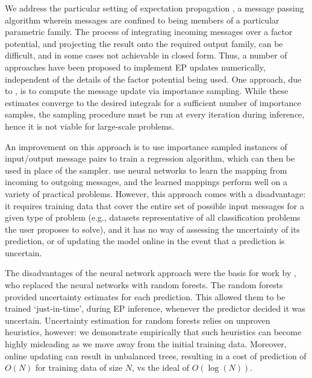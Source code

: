 \documentclass[english]{article}
\theoremstyle{plain}
\theoremstyle{plain}
\begin{document}
We address the particular setting of expectation propagation \citep{Minka2001}, a message
passing algorithm wherein messages are confined to being members of a particular parametric
family. The process of integrating incoming messages over a factor potential, and projecting the result onto the
required output family, can be difficult, and in some cases not achievable in closed form.
Thus, a number of approaches have been proposed to implement EP updates numerically, independent
of the details of the factor potential being used.  One approach, due to
\citet{Barthelme2011}, is to compute the message update via importance sampling.
While these estimates converge to the desired integrals for a sufficient number of importance samples, the sampling procedure must be run at every iteration during inference,
hence  it is not viable for large-scale problems.

An improvement on this approach is to use importance sampled instances of input/output
message pairs to train a regression algorithm, which can then be used in place of the sampler.
\citet{Heess2013} use neural networks to learn the mapping from incoming
to outgoing messages, and the learned mappings perform well on a variety of practical problems.
However, this approach comes with a disadvantage: it requires training data
that cover the entire set of possible input messages for a given type of problem (e.g., datasets
representative of all classification problems the user proposes to solve),
and it has no way of assessing the uncertainty of its prediction, or of updating
the model online in the event that a prediction is uncertain.


The disadvantages of the neural network approach were the basis for work by
\cite{Eslami2014}, who replaced the neural networks with random forests.
The random forests  provided uncertainty estimates for each prediction. This allowed them to be trained `just-in-time', during EP inference, whenever the predictor decided it was uncertain.
Uncertainty estimation for random forests relies on unproven heuristics, however: we demonstrate
empirically that such heuristics can become highly misleading as we move away from the initial
training data.
Moreover,  online updating
can result in unbalanced trees, resulting in a cost of prediction of $O(N)$ for training data of size $N$, vs the ideal of $O(\log(N))$.


\end{document}
